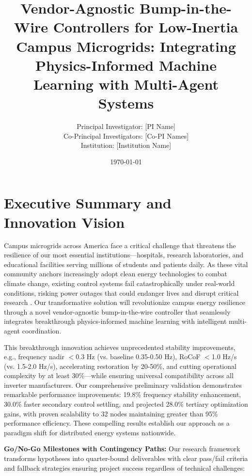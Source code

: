 \documentclass[12pt]{article}
\begin{document}
\title{\Large\textbf{Vendor-Agnostic Bump-in-the-Wire Controllers for Low-Inertia Campus Microgrids: Integrating Physics-Informed Machine Learning with Multi-Agent Systems}}


\author{Principal Investigator: [PI Name]\\
Co-Principal Investigators: [Co-PI Names]\\
Institution: [Institution Name]}

\date{\today}

\maketitle

\section{Executive Summary and Innovation Vision}

Campus microgrids across America face a critical challenge that threatens the resilience of our most essential institutions---hospitals, research laboratories, and educational facilities serving millions of students and patients daily. As these vital community anchors increasingly adopt clean energy technologies to combat climate change, existing control systems fail catastrophically under real-world conditions, risking power outages that could endanger lives and disrupt critical research \cite{molina2020,katiraei2008}. Our transformative solution will revolutionize campus energy resilience through a novel vendor-agnostic bump-in-the-wire controller that seamlessly integrates breakthrough physics-informed machine learning with intelligent multi-agent coordination.

This breakthrough innovation achieves unprecedented stability improvements, e.g., frequency nadir $<$0.3 Hz (vs. baseline 0.35-0.50 Hz), RoCoF $<$1.0 Hz/s (vs. 1.5-2.0 Hz/s), accelerating restoration by 20-50\%, and cutting operational complexity by at least 30\%---while ensuring universal compatibility across all inverter manufacturers. Our comprehensive preliminary validation demonstrates remarkable performance improvements: 19.8\% frequency stability enhancement, 30.0\% faster secondary control settling, and projected 28.0\% tertiary optimization gains, with proven scalability to 32 nodes maintaining greater than 95\% performance efficiency. These compelling results establish our approach as a paradigm shift for distributed energy systems nationwide.

\textbf{Go/No-Go Milestones with Contingency Paths:} Our research framework transforms hypotheses into quarter-bound deliverables with clear pass/fail criteria and fallback strategies ensuring project success regardless of technical challenges:
\end{document}
